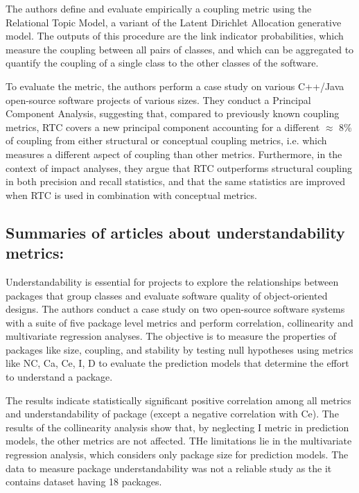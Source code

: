         The authors define and evaluate empirically a coupling metric using the Relational Topic Model, a variant of the Latent Dirichlet Allocation generative model. The outputs of this procedure are the link indicator probabilities, which measure the coupling between all pairs of classes, and which can be aggregated to quantify the coupling of a single class to the other classes of the software. 
        
        To evaluate the metric, the authors perform a case study on various C++/Java open-source software projects of various sizes. They conduct a Principal Component Analysis, suggesting that, compared to previously known coupling metrics, RTC covers a new principal component accounting for a different $\approx$ 8\% of coupling from either structural or conceptual coupling metrics, i.e. which measures a different aspect of coupling than other metrics. Furthermore, in the context of impact analyses, they argue that RTC outperforms structural coupling in both precision and recall statistics, and that the same statistics are improved when RTC is used in combination with conceptual metrics.
    
\subsection{Summaries of articles about understandability metrics:  \cite{s68_understandability}}

        Understandability is essential for projects to explore the relationships between packages that group classes and evaluate software quality of object-oriented designs. The authors conduct a case study on two open-source software systems with a suite of five package level metrics and perform correlation, collinearity and multivariate regression analyses. The objective is to measure the properties of packages like size, coupling, and stability by testing null hypotheses using metrics like NC, Ca, Ce, I, D to evaluate the prediction models that determine the effort to understand a package.
        
        The results indicate statistically significant positive correlation among all metrics and understandability of package (except a negative correlation with Ce). The results of the collinearity analysis show that, by neglecting I metric in prediction models, the other metrics are not affected. THe limitations lie in the multivariate regression analysis, which considers only package size for prediction models. The data to measure package understandability was not a reliable study as the it contains dataset having 18 packages.

